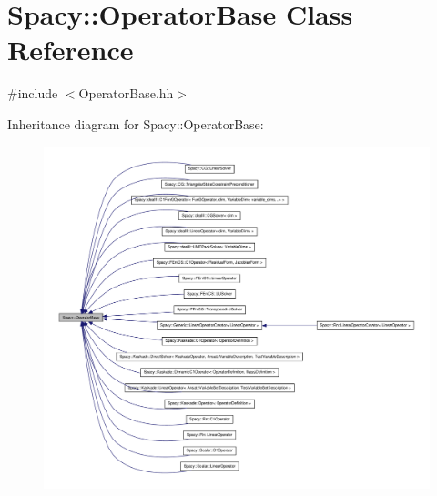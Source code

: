 \hypertarget{classSpacy_1_1OperatorBase}{\section{\-Spacy\-:\-:\-Operator\-Base \-Class \-Reference}
\label{classSpacy_1_1OperatorBase}
}


{\ttfamily \#include $<$\-Operator\-Base.\-hh$>$}



\-Inheritance diagram for \-Spacy\-:\-:\-Operator\-Base\-:
\nopagebreak
\begin{figure}[H]
\begin{center}
\leavevmode
\includegraphics[width=350pt]{classSpacy_1_1OperatorBase__inherit__graph}
\end{center}
\end{figure}

